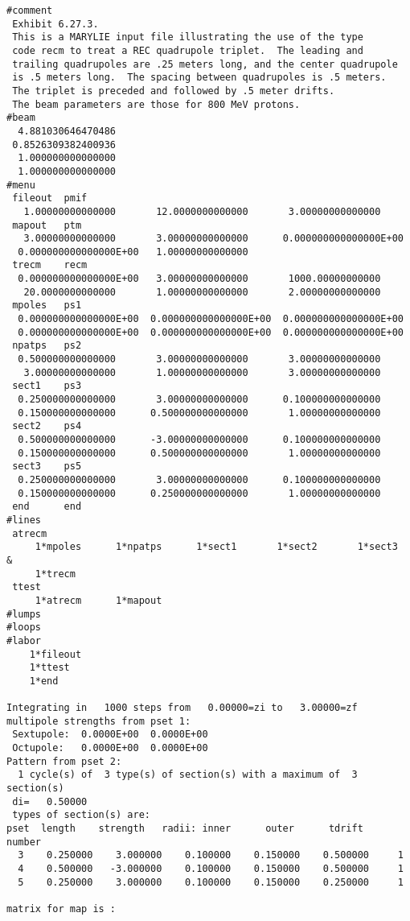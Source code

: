 \begin{footnotesize}
\begin{verbatim}
#comment
 Exhibit 6.27.3.
 This is a MARYLIE input file illustrating the use of the type
 code recm to treat a REC quadrupole triplet.  The leading and
 trailing quadrupoles are .25 meters long, and the center quadrupole
 is .5 meters long.  The spacing between quadrupoles is .5 meters.
 The triplet is preceded and followed by .5 meter drifts.
 The beam parameters are those for 800 MeV protons.
#beam
  4.881030646470486
 0.8526309382400936
  1.000000000000000
  1.000000000000000
#menu
 fileout  pmif
   1.00000000000000       12.0000000000000       3.00000000000000
 mapout   ptm
   3.00000000000000       3.00000000000000      0.000000000000000E+00
  0.000000000000000E+00   1.00000000000000
 trecm    recm
  0.000000000000000E+00   3.00000000000000       1000.00000000000
   20.0000000000000       1.00000000000000       2.00000000000000
 mpoles   ps1
  0.000000000000000E+00  0.000000000000000E+00  0.000000000000000E+00
  0.000000000000000E+00  0.000000000000000E+00  0.000000000000000E+00
 npatps   ps2
  0.500000000000000       3.00000000000000       3.00000000000000
   3.00000000000000       1.00000000000000       3.00000000000000
 sect1    ps3
  0.250000000000000       3.00000000000000      0.100000000000000
  0.150000000000000      0.500000000000000       1.00000000000000
 sect2    ps4
  0.500000000000000      -3.00000000000000      0.100000000000000
  0.150000000000000      0.500000000000000       1.00000000000000
 sect3    ps5
  0.250000000000000       3.00000000000000      0.100000000000000
  0.150000000000000      0.250000000000000       1.00000000000000
 end      end
#lines
 atrecm
     1*mpoles      1*npatps      1*sect1       1*sect2       1*sect3    &
     1*trecm
 ttest
     1*atrecm      1*mapout
#lumps
#loops
#labor
    1*fileout
    1*ttest
    1*end

Integrating in   1000 steps from   0.00000=zi to   3.00000=zf
multipole strengths from pset 1:
 Sextupole:  0.0000E+00  0.0000E+00
 Octupole:   0.0000E+00  0.0000E+00
Pattern from pset 2:
  1 cycle(s) of  3 type(s) of section(s) with a maximum of  3 section(s)
 di=   0.50000
 types of section(s) are:
pset  length    strength   radii: inner      outer      tdrift    number
  3    0.250000    3.000000    0.100000    0.150000    0.500000     1
  4    0.500000   -3.000000    0.100000    0.150000    0.500000     1
  5    0.250000    3.000000    0.100000    0.150000    0.250000     1

matrix for map is :


\end{verbatim}
\end{footnotesize}
